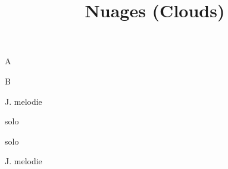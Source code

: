 \documentclass[timestamp]{jazzgrid}
\title{Nuages (Clouds)}
\begin{document}
\maketitle
\begin{musicsection}{A}
\barline
	{}
	{}
	{}
	{\barfour{}{}{}{}{}}
\barline
	{}
	{}
	{}
	{\barfour{}{}{}{}{}}
\barline
	{}
	{}
	{}
	{\barfour{}{             }{}{}{}}
\barline
	{}
	{}
	{}
	{}
\end{musicsection}
\begin{musicsection}{B}
\barline
	{}
	{}
	{}
	{\barfour{}{}{}{}{}}
\barline
	{}
	{}
	{}
	{\barfour{}{}{}{}{}}
\barline
	{}
	{\barfour{}{            }{}{}{}}
	{}
	{\barfour{}{             }{}{}{}}
\barline
	{}
	{}
	{}
	{}
\end{musicsection}

\footnotesize
\begin{description}[noitemsep,align=right,labelwidth=\widthof{\bfseries{AB}}]
	\item [AB] J. melodie
	\item [AB] solo
	\item [AB] solo
	\item [AB] J. melodie
\end{description}
\end{document}
